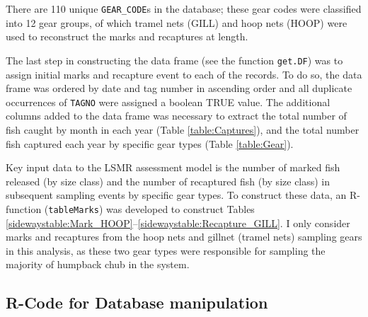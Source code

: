 There are 110 unique \verb"GEAR_CODE"s in the database; these gear codes were classified into 12 gear groups, of which tramel nets (GILL)  and hoop nets (HOOP) were used to reconstruct the marks and recaptures at length.

The last step in constructing the data frame (see the function \verb"get.DF") was to assign initial marks and recapture event to each of the records.  To do so, the data frame was ordered by date and tag number in ascending order and all duplicate occurrences of \verb"TAGNO" were assigned a boolean TRUE value.  The additional columns added to the data frame was necessary to extract the total number of fish caught by month in each year (Table \ref{table:Captures}), and the total number fish captured each year by specific gear types (Table \ref{table:Gear}).

Key input data to the LSMR assessment model is the number of marked fish released (by size class) and the number of recaptured fish (by size class) in subsequent sampling events by specific gear types.  To construct these data, an R-function (\verb"tableMarks") was developed to construct Tables \ref{sidewaystable:Mark_HOOP}--\ref{sidewaystable:Recapture_GILL}.  I only consider marks and recaptures from the hoop nets and gillnet (tramel nets) sampling gears in this analysis, as these two gear types were responsible for sampling the majority of humpback chub in the system.











\subsection{R-Code for Database manipulation} %
\label{sub:r_code_for_database_manipulation}
\footnotesize


\normalsize

